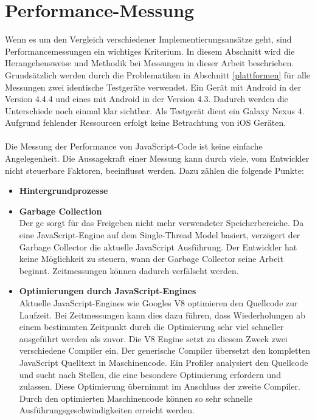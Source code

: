 \section{Performance-Messung}
Wenn es um den Vergleich verschiedener Implementierungsansätze geht, sind Performancemessungen ein wichtiges Kriterium. In diesem Abschnitt wird die Herangehensweise und Methodik bei Messungen in dieser Arbeit beschrieben. Grundsätzlich werden durch die Problematiken in Abschnitt \ref{plattformen} für alle Messungen zwei identische Testgeräte verwendet. Ein Gerät mit Android in der Version 4.4.4 und eines mit Android in der Version 4.3. Dadurch werden die Unterschiede noch einmal klar sichtbar. Als Testgerät dient ein Galaxy Nexus 4. Aufgrund fehlender Ressourcen erfolgt keine Betrachtung von iOS Geräten. 
\\\\
Die Messung der Performance von JavaScript-Code ist keine einfache Angelegenheit. Die Aussagekraft einer Messung kann durch viele, vom Entwickler nicht steuerbare Faktoren, beeinflusst werden. Dazu zählen die folgende Punkte: 
\begin{itemize}
	\item \textbf{Hintergrundprozesse}
	
	\item \textbf{Garbage Collection}\\
	Der \gls{gc} sorgt für das Freigeben nicht mehr verwendeter Speicherbereiche. Da eine JavaScript-Engine auf dem Single-Thread Model basiert, verzögert der Garbage Collector die aktuelle JavaScript Ausführung. Der Entwickler hat keine Möglichkeit zu steuern, wann der Garbage Collector seine Arbeit beginnt. Zeitmessungen können dadurch verfälscht werden.\cite{WritingMemoryEfficientJavaScript}
	
	\item \textbf{Optimierungen durch JavaScript-Engines}\\
	Aktuelle JavaScript-Engines wie Googles V8 optimieren den Quellcode zur Laufzeit. Bei Zeitmessungen kann dies dazu führen, dass Wiederholungen ab einem bestimmten Zeitpunkt durch die Optimierung sehr viel schneller ausgeführt werden als zuvor. Die V8 Engine setzt zu diesem Zweck zwei verschiedene Compiler ein. Der generische Compiler übersetzt den kompletten JavaScript Quelltext in Maschinencode. Ein Profiler analysiert den Quellcode und sucht nach Stellen, die eine besondere Optimierung erfordern und zulassen. Diese Optimierung übernimmt im Anschluss der zweite Compiler. Durch den optimierten Maschinencode können so sehr schnelle Ausführungsgeschwindigkeiten erreicht werden.\cite{ChromiumCodeOptimizations}
	
\end{itemize}
